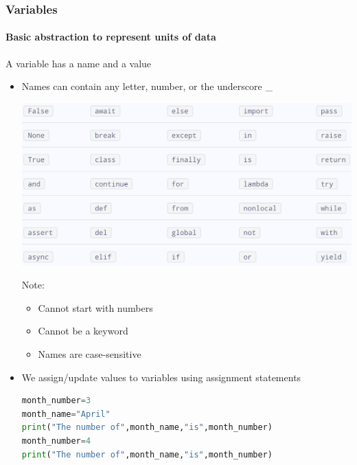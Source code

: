 \documentclass{beamer}%
\begin{document}
\begin{frame}[fragile]
\frametitle{{Variables}}
\framesubtitle{Basic abstraction to represent units of data}
A variable has a name and a value
\begin{itemize}
\item Names can contain any letter, number, or the underscore \_
\\
\begin{minipage}{0.50\textwidth}
\includegraphics[width=1.0\textwidth]{figures/keywords}
\end{minipage}
\begin{minipage}{0.42\textwidth}
Note:
\begin{itemize}
\item Cannot start with numbers
\item Cannot be a  keyword
\item Names are case-sensitive
\end{itemize}
\end{minipage}

\item We assign/update values to variables using assignment statements
\begin{lstlisting}[language=python]
month_number=3
month_name="April"
print("The number of",month_name,"is",month_number)
month_number=4
print("The number of",month_name,"is",month_number)
\end{lstlisting}
\end{itemize}
\end{frame}


\end{document}

